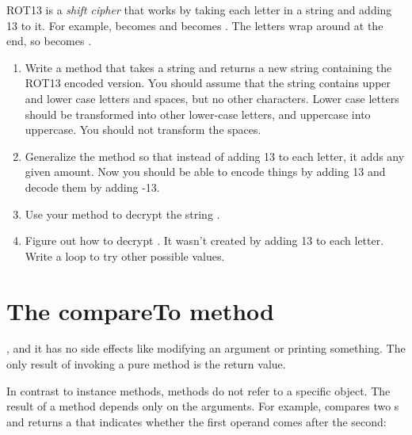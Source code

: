 \begin{exercise}

ROT13 is a {\em shift cipher} that works by taking each letter in a string and adding 13 to it.
For example,  becomes  and  becomes .
The letters wrap around at the end, so  becomes .

\begin{enumerate}

\item Write a method that takes a string and returns a new string containing the ROT13 encoded version.
You should assume that the string contains upper and lower case letters and spaces, but no other characters.
Lower case letters should be transformed into other lower-case letters, and uppercase into uppercase.
You should not transform the spaces.

\item Generalize the method so that instead of adding 13 to each letter, it adds any given amount.
Now you should be able to encode things by adding 13 and decode them by adding -13.

\item Use your method to decrypt the string .

\item Figure out how to decrypt .
It wasn't created by adding 13 to each letter.
Write a loop to try other possible values.

\end{enumerate}

\end{exercise}

\section{The compareTo method}


, and it has no side effects like modifying an argument or printing something.
The only result of invoking a pure method is the return value.

In contrast to instance methods,  methods do not refer to a specific object.
The result of a  method depends only on the arguments.
For example,  compares two s and returns a  that indicates whether the first operand comes after the second:

